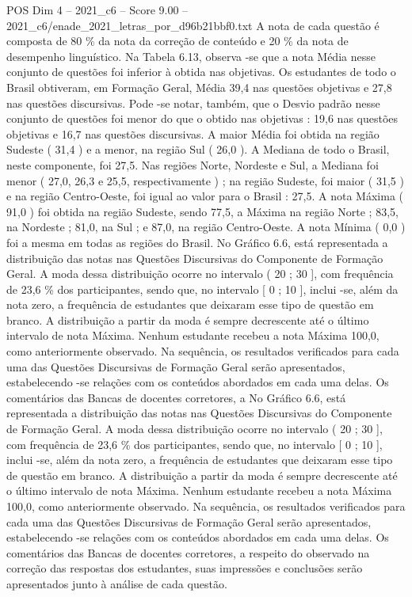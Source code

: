 \begin{textsample}{POS Dim 4 – 2021\_c6 – Score 9.00 – 2021\_c6/enade\_2021\_letras\_por\_d96b21bbf0.txt}
A nota de cada questão é composta de 80 \% da nota da correção de conteúdo e 20 \% da nota de desempenho linguístico.
Na Tabela 6.13, observa -se que a nota Média nesse conjunto de questões foi inferior à obtida nas objetivas.
Os estudantes de todo o Brasil obtiveram, em Formação Geral, Média 39,4 nas questões objetivas e 27,8 nas questões discursivas.
Pode -se notar, também, que o Desvio padrão nesse conjunto de questões foi menor do que o obtido nas objetivas : 19,6 nas questões objetivas e 16,7 nas questões discursivas.
A maior Média foi obtida na região Sudeste ( 31,4 ) e a menor, na região Sul ( 26,0 ).
A Mediana de todo o Brasil, neste componente, foi 27,5.
Nas regiões Norte, Nordeste e Sul, a Mediana foi menor ( 27,0, 26,3 e 25,5, respectivamente ) ; na região Sudeste, foi maior ( 31,5 ) e na região Centro-Oeste, foi igual ao valor para o Brasil : 27,5.
A nota Máxima ( 91,0 ) foi obtida na região Sudeste, sendo 77,5, a Máxima na região Norte ; 83,5, na Nordeste ; 81,0, na Sul ; e 87,0, na região Centro-Oeste.
A nota Mínima ( 0,0 ) foi a mesma em todas as regiões do Brasil.
No Gráfico 6.6, está representada a distribuição das notas nas Questões Discursivas do Componente de Formação Geral.
A moda dessa distribuição ocorre no intervalo ( 20 ; 30 ], com frequência de 23,6 \% dos participantes, sendo que, no intervalo [ 0 ; 10 ], inclui -se, além da nota zero, a frequência de estudantes que deixaram esse tipo de questão em branco.
A distribuição a partir da moda é sempre decrescente até o último intervalo de nota Máxima.
Nenhum estudante recebeu a nota Máxima 100,0, como anteriormente observado.
Na sequência, os resultados verificados para cada uma das Questões Discursivas de Formação Geral serão apresentados, estabelecendo -se relações com os conteúdos abordados em cada uma delas.
Os comentários das Bancas de docentes corretores, a No Gráfico 6.6, está representada a distribuição das notas nas Questões Discursivas do Componente de Formação Geral.
A moda dessa distribuição ocorre no intervalo ( 20 ; 30 ], com frequência de 23,6 \% dos participantes, sendo que, no intervalo [ 0 ; 10 ], inclui -se, além da nota zero, a frequência de estudantes que deixaram esse tipo de questão em branco.
A distribuição a partir da moda é sempre decrescente até o último intervalo de nota Máxima.
Nenhum estudante recebeu a nota Máxima 100,0, como anteriormente observado.
Na sequência, os resultados verificados para cada uma das Questões Discursivas de Formação Geral serão apresentados, estabelecendo -se relações com os conteúdos abordados em cada uma delas.
Os comentários das Bancas de docentes corretores, a respeito do observado na correção das respostas dos estudantes, suas impressões e conclusões serão apresentados junto à análise de cada questão.

\end{textsample}
